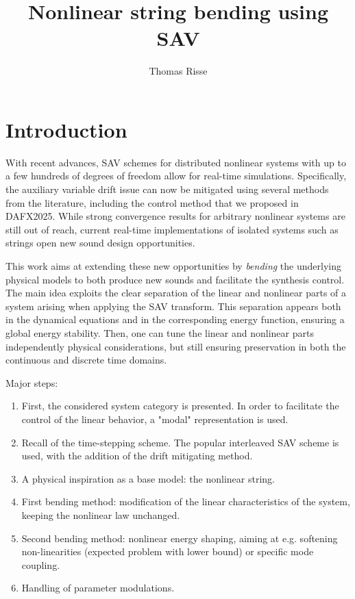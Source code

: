 \documentclass[9pt]{scrartcl}
\title{Nonlinear string bending using SAV}
\author{Thomas Risse}
\begin{document}
	\maketitle
	
  \section{Introduction}

  With recent advances, SAV schemes for distributed nonlinear systems with up to a few hundreds of degrees of freedom allow for real-time simulations. Specifically, the auxiliary variable drift issue can now be mitigated using several methods from the literature, including the control method that we proposed in DAFX2025. While strong convergence results for arbitrary nonlinear systems are still out of reach, current real-time implementations of isolated systems such as strings open new sound design opportunities. 

  This work aims at extending these new opportunities by \emph{bending} the underlying physical models to both produce new sounds and facilitate the synthesis control.
  The main idea exploits the clear separation of the linear and nonlinear parts of a system arising when applying the SAV transform. This separation appears both in the dynamical equations and in the corresponding energy function, ensuring a global energy stability. Then, one can tune the linear and nonlinear parts independently physical considerations, but still ensuring  preservation in both the continuous and discrete time domains. 

  Major steps:
  \begin{enumerate}
    \item First, the considered system category is presented. In order to facilitate the control of the linear behavior, a "modal" representation is used.
    \item Recall of the time-stepping scheme. The popular interleaved SAV scheme is used, with the addition of the drift mitigating method.
    \item A physical inspiration as a base model: the nonlinear string.
    \item First bending method: modification of the linear characteristics of the system, keeping the nonlinear law unchanged.
    \item Second bending method: nonlinear energy shaping, aiming at e.g. softening non-linearities (expected problem with lower bound) or specific mode coupling.
    \item Handling of parameter modulations.
  \end{enumerate}
\end{document}
